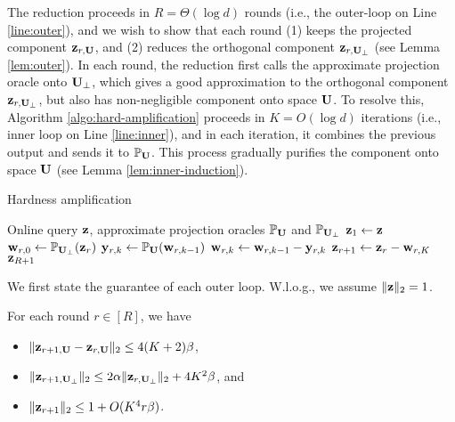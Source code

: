 The reduction proceeds in $R = \Theta(\log d)$ rounds (i.e., the outer-loop on Line \ref{line:outer}), and we wish to show that each round (1) keeps the projected component $\mathbf{z}_{r, \mathbf{U}}$, and (2) reduces the orthogonal component $\mathbf{z}_{r, \mathbf{U}_\perp}$ (see Lemma \ref{lem:outer}).
In each round, the reduction first calls the approximate projection oracle onto $\mathbf{U}_\perp$, which gives a good approximation to the orthogonal component $\mathbf{z}_{r, \mathbf{U}_\perp}$, but also has non-negligible component onto space $\mathbf{U}$.
To resolve this, Algorithm \ref{algo:hard-amplification} proceeds in $K = O(\log d)$ iterations (i.e., inner loop on Line \ref{line:inner}), and in each iteration, it combines the previous output and sends it to $\mathbb{P}_{\mathbf{U}}$. This process gradually purifies the component onto space $\mathbf{U}$ (see Lemma \ref{lem:inner-induction}).


\begin{algorithm}[!htbp]
\caption{Hardness amplification}
\label{algo:hard-amplification}
\begin{algorithmic}[1]
 Online query $\mathbf{z}$, approximate projection oracles $\mathbb{P}_{\mathbf{U}}$ and $\mathbb{P}_{\mathbf{U}_\perp}$
\State $\mathbf{z}_1 \leftarrow \mathbf{z}$
\label{line:outer}
\State $\mathbf{w}_{r, 0} \leftarrow \mathbb{P}_{\mathbf{U}_\perp}(\mathbf{z}_r)$
 \label{line:inner}
\State $\mathbf{y}_{r, k} \leftarrow \mathbb{P}_{\mathbf{U}}(\mathbf{w}_{r, k-1})$
\State $\mathbf{w}_{r, k} \leftarrow \mathbf{w}_{r, k-1} - \mathbf{y}_{r, k} $ \label{line:w-def}
\EndFor
\State $\mathbf{z}_{r+1} \leftarrow \mathbf{z}_{r} - \mathbf{w}_{r, K}$ \label{line:update}
\EndFor
\State \Return $\mathbf{z}_{R+1}$
\end{algorithmic}
\end{algorithm}



We first state the guarantee of each outer loop. W.l.o.g., we assume $\|\mathbf{z}\|_2 = 1$.
\begin{lemma}
\label{lem:outer}
For each round $r \in [R]$, we have
\begin{itemize}
\item $\|\mathbf{z}_{r+1, \mathbf{U}} - \mathbf{z}_{r, \mathbf{U}}\|_2 \leq 4(K+2)\beta$, 
\item $\|\mathbf{z}_{r+1, \mathbf{U}_\perp}\|_2 \leq 2\alpha \|\mathbf{z}_{r, \mathbf{U}_\perp}\|_2 + 4K^2\beta$, and
\item $\|\mathbf{z}_{r+1}\|_2 \leq 1 + O(K^4r \beta)$.
\end{itemize}
\end{lemma}


